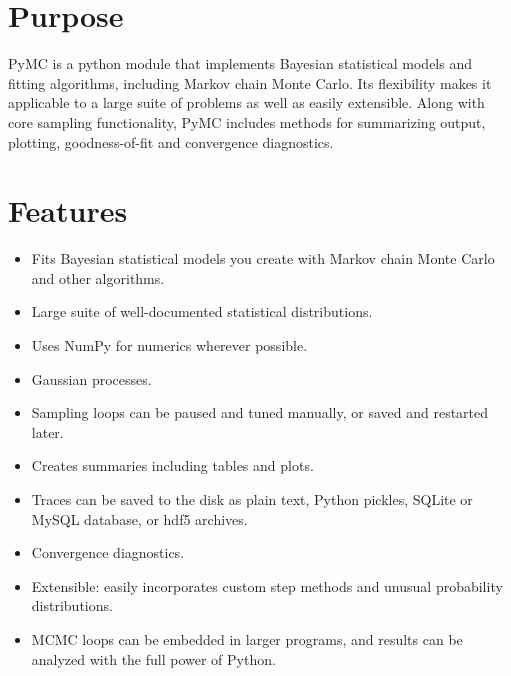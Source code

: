 





\hypertarget{purpose}{}
\section{Purpose}
\label{purpose}

PyMC is a python module that implements Bayesian statistical models and
fitting algorithms, including Markov chain Monte Carlo.
Its flexibility makes it applicable to a large suite of problems as well as
easily extensible. Along with core sampling functionality, PyMC includes
methods for summarizing output, plotting, goodness-of-fit and convergence
diagnostics.



\hypertarget{features}{}
\section{Features}
\label{features}
\begin{itemize}
\item {} 
Fits Bayesian statistical models you create with Markov chain Monte Carlo and
other algorithms.

\item {} 
Large suite of well-documented statistical distributions.

\item {} 
Uses NumPy for numerics wherever possible.

\item {} 
Gaussian processes.

\item {} 
Sampling loops can be paused and tuned manually, or saved and restarted later.

\item {} 
Creates summaries including tables and plots.

\item {} 
Traces can be saved to the disk as plain text, Python pickles, SQLite or MySQL
database, or hdf5 archives.

\item {} 
Convergence diagnostics.

\item {} 
Extensible: easily incorporates custom step methods and unusual probability
distributions.

\item {} 
MCMC loops can be embedded in larger programs, and results can be analyzed
with the full power of Python.

\end{itemize}


